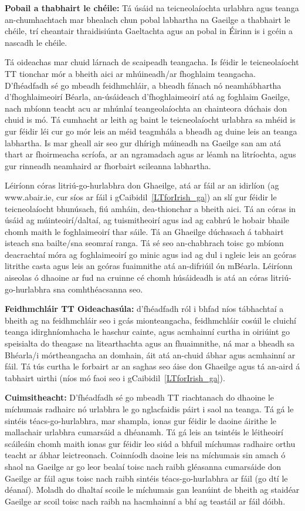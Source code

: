 \begin{multicols}{2}
\textbf{Pobail a thabhairt le chéile:} Tá úsáid na teicneolaíochta urlabhra agus teanga an-chumhachtach mar bhealach chun pobal labhartha na Gaeilge a thabhairt le chéile, trí cheantair thraidisiúnta Gaeltachta agus an pobal in Éirinn is i gcéin a nascadh le chéile.

Tá oideachas mar chuid lárnach de scaipeadh teangacha. Is féidir le teicneolaíocht TT tionchar mór a bheith aici ar mhúineadh/ar fhoghlaim teangacha. D’fhéadfadh sé go mbeadh feidhmchláir, a bheadh fánach nó neamhábhartha d’fhoghlaimeoirí Béarla, an-úsáideach d’fhoghlaimeoirí atá ag foghlaim Gaeilge, nach mbíonn teacht acu ar mhúnlaí teangeolaíochta an chainteora dúchais don chuid is mó. Tá cumhacht ar leith ag baint le teicneolaíocht urlabhra sa mhéid is gur féidir léi cur go mór leis an méid teagmhála a bheadh ag duine leis an teanga labhartha. Is mar gheall air seo gur dhírigh múineadh na Gaeilge san am atá thart ar fhoirmeacha scríofa, ar an ngramadach agus ar léamh na litríochta, agus gur rinneadh neamhaird ar fhorbairt scileanna labhartha.

Léiríonn córas litriú-go-hurlabhra don Ghaeilge, atá ar fáil ar an idirlíon (ag www.abair.ie, cur síos ar fáil i gCaibidil~\ref{LTforIrish_ga}) an slí gur féidir le teicneolaíocht bhunúsach, fiú amháin, dea-thionchar a bheith aici. Tá an córas in úsáid ag múinteoirí/daltaí, ag tuismitheoirí agus iad ag cabhrú le hobair bhaile chomh maith le foghlaimeoirí thar sáile. Tá an Ghaeilge dúchasach á tabhairt isteach sna bailte/sna seomraí ranga. Tá sé seo an-chabhrach toisc go mbíonn deacrachtaí móra ag foghlaimeoirí go minic agus iad ag dul i ngleic leis an gcóras litrithe casta agus leis an gcóras fuaimnithe atá an-difriúil ón mBéarla. Léiríonn aiseolas ó dhaoine ar fud na cruinne cé chomh húsáideadh is atá an córas litriú-go-hurlabhra sna comhthéacsanna seo.

\textbf{Feidhmchláir TT Oideachasúla:} d’fhéadfadh ról i bhfad níos tábhachtaí a bheith ag na feidhmchláir seo i gcás mionteangacha, feidhmchláir cosúil le cluichí teanga idirghníomhacha le haschur cainte, agus acmhainní curtha in oiriúint go speisialta do theagasc na litearthachta agus an fhuaimnithe, ná mar a bheadh sa Bhéarla/i mórtheangacha an domhain, áit atá an-chuid ábhar agus acmhainní ar fáil. Tá tús curtha le forbairt ar an saghas seo áise don Ghaeilge agus tá an-aird á tabhairt uirthi (níos mó faoi seo i gCaibidil~\ref{LTforIrish_ga}).

\textbf {Cuimsitheacht:} D’fhéadfadh sé go mbeadh TT riachtanach do dhaoine le míchumais radhairc nó urlabhra le go nglacfaidis páirt i saol na teanga. Tá gá le sintéis téacs-go-hurlabhra, mar shampla, ionas gur féidir le daoine áirithe le mallachair urlabhra cumarsáid a dhéanamh. Tá gá leis an tsintéis le léitheoirí scáileáin chomh maith ionas gur féidir leo siúd a bhfuil míchumas radhairc orthu teacht ar ábhar leictreonach. Coinníodh daoine leis na míchumais sin amach ó shaol na Gaeilge ar go leor bealaí toisc nach raibh gléasanna cumarsáide don Gaeilge ar fáil agus toisc nach raibh sintéis téacs-go-hurlabhra ar fáil (go dtí le déanaí). Moladh do dhaltaí scoile le míchumais gan leanúint de bheith ag staidéar Gaeilge ar scoil toisc nach raibh na hacmhainní a bhí ag teastáil ar fáil dóibh.


\end{multicols}
